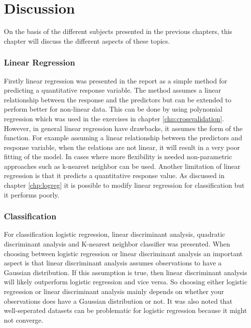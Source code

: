 \chapter{Discussion}
\label{chp:disc}
On the basis of the different subjects presented in the previous chapters, this chapter will discuss the different aspects of these  topics.

\subsection{Linear Regression}

Firstly linear regression was presented in the report as a simple method for predicting a quantitative response variable. The method assumes a linear relationship between the response and the predictors but can be extended to perform better for non-linear data. This can be done by using polynomial regression which was used in the exercises in chapter \ref{chp:crossvalidation}. However, in general linear regression have drawbacks, it assumes the form of the function. For example assuming a linear relationship between the predictors and response variable, when the relations are not linear, it will result in a very poor fitting of the model. In cases where more flexibility is needed non-parametric approaches such as k-nearest neighbor can be used. Another limitation of linear regression is that it predicts a quantitative response value. As discussed in chapter \ref{chp:logreg} it is possible to modify linear regression for classification but it performs poorly.

\subsection{Classification}

For classification logistic regression, linear discriminant analysis, quadratic discriminant analysis and K-nearest neighbor classifier was presented. When choosing between logistic regression or linear discriminant analysis an important aspect is that linear discriminant analysis assumes observations to have a Gaussian distribution. If this assumption is true, then linear discriminant analysis will likely outperform logistic regression and vice versa. So choosing either logistic regression or linear discriminant analysis mainly depends on whether your observations does have a Gaussian distribution or not. It was also noted that well-seperated datasets can be problematic for logistic regression because it might not converge.
 
